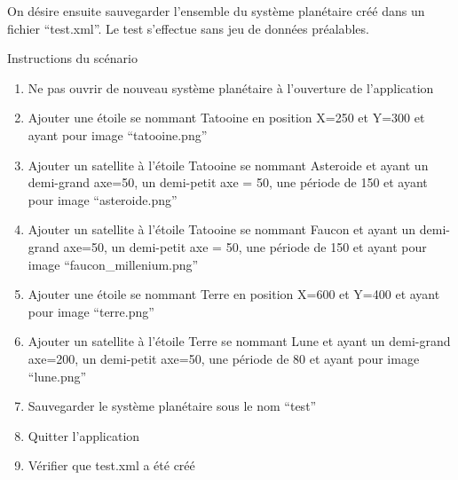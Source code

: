\documentclass[a4paper,10pt]{article}
\begin{document}
On désire ensuite sauvegarder l'ensemble du système planétaire créé dans un fichier ``test.xml''.
Le test s'effectue sans jeu de données préalables.
\begin{center}
 \begin{Large}
    Instructions du scénario
  \end{Large}
\end{center}
\begin{enumerate}
 \item Ne pas ouvrir de nouveau système planétaire à l'ouverture de l'application
 \item Ajouter une étoile se nommant Tatooine en position X=250 et Y=300 et ayant pour image ``tatooine.png''
 \item Ajouter un satellite à l'étoile Tatooine se nommant Asteroide et ayant un demi-grand axe=50, un demi-petit axe = 50, une période 
 de 150 et ayant pour image ``asteroide.png'' 
 \item Ajouter un satellite à l'étoile Tatooine se nommant Faucon et ayant un demi-grand axe=50, un demi-petit axe = 50, une période 
de 150 et ayant pour image ``faucon\_millenium.png''
 \item Ajouter une étoile se nommant Terre en position X=600 et Y=400 et ayant pour image ``terre.png''
 \item Ajouter un satellite à l'étoile Terre se nommant Lune et ayant un demi-grand axe=200, un demi-petit axe=50, une période 
 de 80 et ayant pour image ``lune.png''
 \item Sauvegarder le système planétaire sous le nom ``test''
 \item Quitter l'application
 \item Vérifier que test.xml a été créé
\end{enumerate}

\newpage
{}
\end{document}
